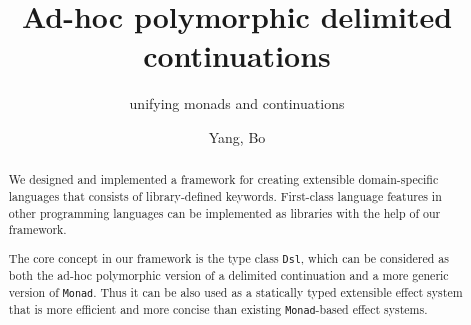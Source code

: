\documentclass[acmsmall,10pt,screen]{acmart}
\begin{document}
\title{Ad-hoc polymorphic delimited continuations}
\subtitle{unifying monads and continuations}

\author{Yang, Bo}


\begin{abstract}
We designed and implemented a framework for creating extensible domain-specific languages that consists of library-defined keywords.
First-class language features in other programming languages can be implemented as libraries with the help of our framework.

The core concept in our framework is the type class \texttt{Dsl}, which can be considered as both the ad-hoc polymorphic version of a delimited continuation and a more generic version of \texttt{Monad}. Thus it can be also used as a statically typed extensible effect system that is more efficient and more concise than existing \texttt{Monad}-based effect systems.
\end{abstract}
\end{document}
